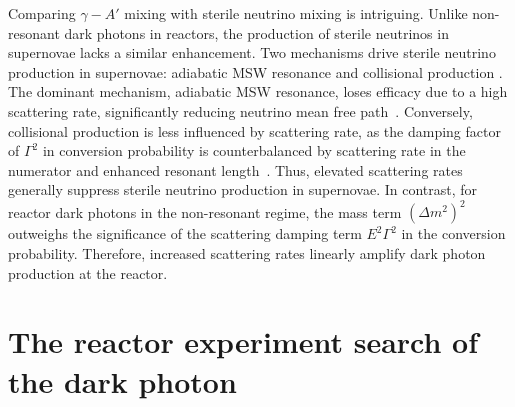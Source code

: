 \documentclass[prd,showpacs,preprintnumbers,amsmath,amssymb,twocolumn,superscriptaddress,notitlepage]{revtex4-2}
\begin{document}
Comparing $\gamma - A'$ mixing with sterile neutrino mixing is intriguing. Unlike non-resonant dark photons in reactors, the production of sterile neutrinos in supernovae lacks a similar enhancement. Two mechanisms drive sterile neutrino production in supernovae: adiabatic MSW resonance and collisional production \cite{Stodolsky:1986dx, Raffelt:2011nc, Arguelles:2016uwb, Ray:2023gtu}. The dominant mechanism, adiabatic MSW resonance, loses efficacy due to a high scattering rate, significantly reducing neutrino mean free path~\cite{Arguelles:2016uwb}. Conversely, collisional production is less influenced by scattering rate, as the damping factor of $\Gamma^{2}$ in conversion probability is counterbalanced by scattering rate in the numerator and enhanced resonant length~\cite{Redondo:2008aa}. Thus, elevated scattering rates generally suppress sterile neutrino production in supernovae. In contrast, for reactor dark photons in the non-resonant regime, the mass term $(\Delta m^2)^2$ outweighs the significance of the scattering damping term $E^2\Gamma^{2}$ in the conversion probability. Therefore, increased scattering rates linearly amplify dark photon production at the reactor.
\\











\section{The reactor experiment search of the dark photon}
\end{document}
